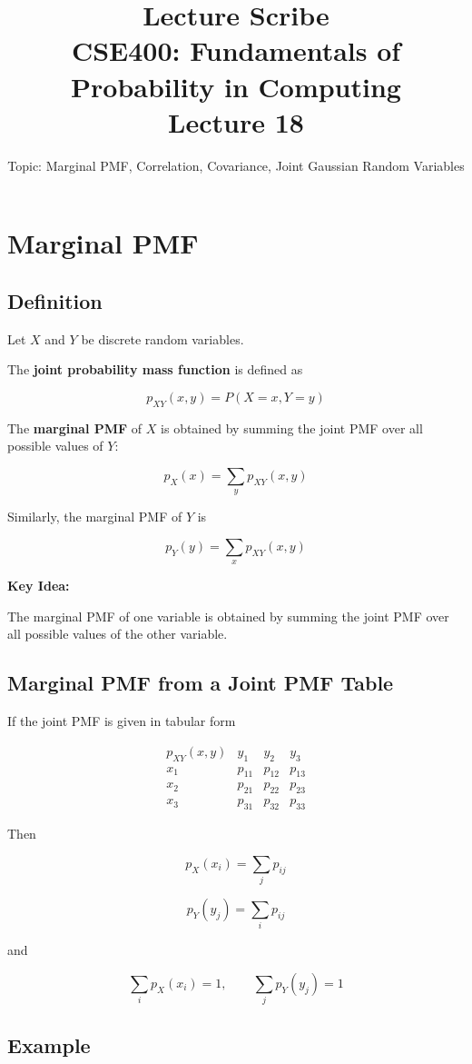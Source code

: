\documentclass[12pt]{article}
\title{Lecture Scribe \\ CSE400: Fundamentals of Probability in Computing \\ Lecture 18}
\author{Topic: Marginal PMF, Correlation, Covariance, Joint Gaussian Random Variables}
\date{}
\begin{document}
\maketitle

\section{Marginal PMF}

\subsection{Definition}

Let $X$ and $Y$ be discrete random variables.

The \textbf{joint probability mass function} is defined as

\[
p_{XY}(x,y) = P(X=x, Y=y)
\]

The \textbf{marginal PMF} of $X$ is obtained by summing the joint PMF over all possible values of $Y$:

\[
p_X(x) = \sum_y p_{XY}(x,y)
\]

Similarly, the marginal PMF of $Y$ is

\[
p_Y(y) = \sum_x p_{XY}(x,y)
\]

\textbf{Key Idea:}

The marginal PMF of one variable is obtained by summing the joint PMF over all possible values of the other variable.

\subsection{Marginal PMF from a Joint PMF Table}

If the joint PMF is given in tabular form

\[
\begin{array}{c|ccc}
p_{XY}(x,y) & y_1 & y_2 & y_3 \\
\hline
x_1 & p_{11} & p_{12} & p_{13} \\
x_2 & p_{21} & p_{22} & p_{23} \\
x_3 & p_{31} & p_{32} & p_{33}
\end{array}
\]

Then

\[
p_X(x_i) = \sum_j p_{ij}
\]

\[
p_Y(y_j) = \sum_i p_{ij}
\]

and

\[
\sum_i p_X(x_i) = 1, \qquad \sum_j p_Y(y_j) = 1
\]

\subsection{Example}
\end{document}

